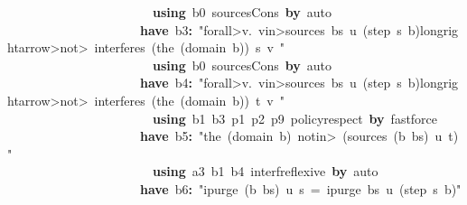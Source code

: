 \documentclass{article}
\newcommand{\syntaxKEYWORDA}[1]{\textcolor[rgb]{0.0,0.4,0.6}{\textbf{#1}}}
\newcommand{\syntaxLITERALA}[1]{\textcolor[rgb]{1.0,0.0,0.8}{#1}}
\newcommand{\syntaxOPERATOR}[1]{\textcolor[rgb]{0.0,0.0,0.0}{\textbf{#1}}}
\newcommand{\syntaxKEYWORDA}[1]{\textcolor[rgb]{0.0,0.4,0.6}{\textbf{#1}}}
\newcommand{\syntaxLITERALA}[1]{\textcolor[rgb]{1.0,0.0,0.8}{#1}}
\newcommand{\syntaxOPERATOR}[1]{\textcolor[rgb]{0.0,0.0,0.0}{\textbf{#1}}}
\newcommand{\syntaxKEYWORDA}[1]{\textcolor[rgb]{0.0,0.4,0.6}{\textbf{#1}}}
\newcommand{\syntaxLITERALA}[1]{\textcolor[rgb]{1.0,0.0,0.8}{#1}}
\newcommand{\syntaxOPERATOR}[1]{\textcolor[rgb]{0.0,0.0,0.0}{\textbf{#1}}}
\newcommand{\syntaxKEYWORDA}[1]{\textcolor[rgb]{0.0,0.4,0.6}{#1}}
\newcommand{\syntaxLITERALA}[1]{\textcolor[rgb]{1.0,0.0,0.8}{\textbf{#1}}}
\newcommand{\syntaxOPERATOR}[1]{\textcolor[rgb]{0.0,0.0,0.0}{#1}}
\newcommand{\syntaxKEYWORDA}[1]{\textcolor[rgb]{0.0,0.4,0.6}{\textbf{#1}}}
\newcommand{\syntaxLITERALA}[1]{\textcolor[rgb]{1.0,0.0,0.8}{#1}}
\newcommand{\syntaxOPERATOR}[1]{\textcolor[rgb]{0.0,0.0,0.0}{\textbf{#1}}}
\newcommand{\syntaxKEYWORDA}[1]{\textcolor[rgb]{0.0,0.4,0.6}{\textbf{#1}}}
\newcommand{\syntaxLITERALA}[1]{\textcolor[rgb]{1.0,0.0,0.8}{#1}}
\newcommand{\syntaxOPERATOR}[1]{\textcolor[rgb]{0.0,0.0,0.0}{\textbf{#1}}}
\begin{document}
{\ }{\ }{\ }{\ }{\ }{\ }{\ }{\ }{\ }{\ }{\ }{\ }{\ }{\ }{\ }{\ }{\ }{\ }{\ }{\ }{\ }{\ }{\ }\syntaxKEYWORDA{using}{\ }b0{\ }sources\usebox{\underscorebox}Cons{\ }\syntaxKEYWORDA{by}{\ }auto\hspace*{\fill}\\
{\ }{\ }{\ }{\ }{\ }{\ }{\ }{\ }{\ }{\ }{\ }{\ }{\ }{\ }{\ }{\ }{\ }{\ }{\ }{\ }{\ }\syntaxKEYWORDA{have}{\ }b3\syntaxOPERATOR{:}{\ }\syntaxLITERALA{"\<forall>v.{\ }v\<in>sources{\ }bs{\ }u{\ }(step{\ }s{\ }b)\<longrightarrow>\<not>{\ }interferes{\ }(the{\ }(domain{\ }b)){\ }s{\ }v{\ }"}\hspace*{\fill}\\
{\ }{\ }{\ }{\ }{\ }{\ }{\ }{\ }{\ }{\ }{\ }{\ }{\ }{\ }{\ }{\ }{\ }{\ }{\ }{\ }{\ }{\ }{\ }\syntaxKEYWORDA{using}{\ }b0{\ }sources\usebox{\underscorebox}Cons{\ }\syntaxKEYWORDA{by}{\ }auto\hspace*{\fill}\\
{\ }{\ }{\ }{\ }{\ }{\ }{\ }{\ }{\ }{\ }{\ }{\ }{\ }{\ }{\ }{\ }{\ }{\ }{\ }{\ }{\ }\syntaxKEYWORDA{have}{\ }b4\syntaxOPERATOR{:}{\ }\syntaxLITERALA{"\<forall>v.{\ }v\<in>sources{\ }bs{\ }u{\ }(step{\ }s{\ }b)\<longrightarrow>\<not>{\ }interferes{\ }(the{\ }(domain{\ }b)){\ }t{\ }v{\ }"}\hspace*{\fill}\\
{\ }{\ }{\ }{\ }{\ }{\ }{\ }{\ }{\ }{\ }{\ }{\ }{\ }{\ }{\ }{\ }{\ }{\ }{\ }{\ }{\ }{\ }{\ }\syntaxKEYWORDA{using}{\ }b1{\ }b3{\ }p1{\ }p2{\ }p9{\ }policy\usebox{\underscorebox}respect{\ }\syntaxKEYWORDA{by}{\ }fastforce\hspace*{\fill}\\
{\ }{\ }{\ }{\ }{\ }{\ }{\ }{\ }{\ }{\ }{\ }{\ }{\ }{\ }{\ }{\ }{\ }{\ }{\ }{\ }{\ }\syntaxKEYWORDA{have}{\ }b5\syntaxOPERATOR{:}{\ }\syntaxLITERALA{"the{\ }(domain{\ }b){\ }\<notin>{\ }(sources{\ }(b{\ }\usebox{\hashbox}{\ }bs){\ }u{\ }t)"}\hspace*{\fill}\\
{\ }{\ }{\ }{\ }{\ }{\ }{\ }{\ }{\ }{\ }{\ }{\ }{\ }{\ }{\ }{\ }{\ }{\ }{\ }{\ }{\ }{\ }{\ }\syntaxKEYWORDA{using}{\ }a3{\ }b1{\ }b4{\ }interf\usebox{\underscorebox}reflexive{\ }\syntaxKEYWORDA{by}{\ }auto\hspace*{\fill}\\
{\ }{\ }{\ }{\ }{\ }{\ }{\ }{\ }{\ }{\ }{\ }{\ }{\ }{\ }{\ }{\ }{\ }{\ }{\ }{\ }{\ }\syntaxKEYWORDA{have}{\ }b6\syntaxOPERATOR{:}{\ }\syntaxLITERALA{"ipurge{\ }(b{\ }\usebox{\hashbox}{\ }bs){\ }u{\ }s{\ }={\ }ipurge{\ }bs{\ }u{\ }(step{\ }s{\ }b)"}\hspace*{\fill}\\
\end{document}
